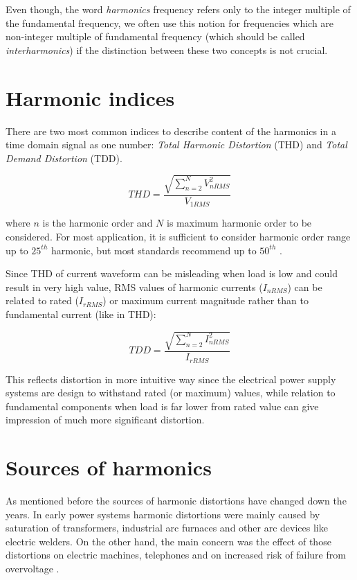 \documentclass[12pt]{report} %
\begin{document}
Even though, the word \textit{harmonics} frequency refers only to the integer multiple of the fundamental frequency, we often use this notion for frequencies which are non-integer multiple of fundamental frequency (which should be called \textit{interharmonics}) if the distinction between these two concepts is not crucial.

\section{Harmonic indices}
There are two most common indices to describe content of the harmonics in a time domain signal as one number: \textit{Total Harmonic Distortion} (THD) and \textit{Total Demand Distortion} (TDD). 



\begin{equation}
	THD = \frac{\sqrt{\sum_{n=2}^{N} V_{n RMS}^2}}{V_{1RMS}}
\end{equation}

where $n$ is the harmonic order and $N$ is maximum harmonic order to be considered. For most application, it is sufficient to consider harmonic order range up to $25^{th}$ harmonic, but most standards recommend up to $50^{th}$ \cite{das}.

Since THD of current waveform can be misleading when load is low and could result in very high value, RMS values of harmonic currents ($I_{nRMS}$) can be related to rated ($I_{rRMS}$) or maximum current magnitude rather than to fundamental current (like in THD):

\begin{equation}
	TDD = \frac{\sqrt{\sum_{n=2}^{N} I_{nRMS}^2}}{I_{rRMS}}
\end{equation}

This reflects distortion in more intuitive way since the electrical power supply systems are design to withstand rated (or maximum) values, while relation to fundamental components when load is far lower from rated value can give impression of much more significant distortion.

\section{Sources of harmonics}
As mentioned before the sources of harmonic distortions have changed down the years. In early power systems harmonic distortions were mainly caused by saturation of transformers, industrial arc furnaces and other arc devices like electric welders. On the other hand, the main concern was the effect of those distortions on electric machines, telephones and on increased risk of failure from overvoltage \cite{rosa}.
\end{document}
